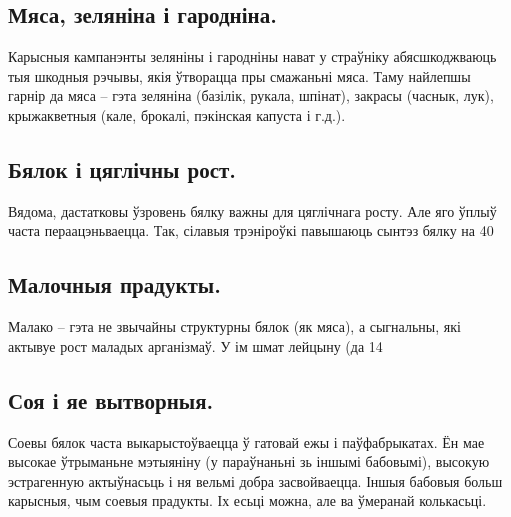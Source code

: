 \subsection{Мяса, зеляніна і гародніна.}
Карысныя кампанэнты зеляніны і гародніны нават у страўніку абясшкоджваюць тыя шкодныя рэчывы, якія ўтворацца пры смажаньні мяса. Таму найлепшы гарнір да мяса – гэта зеляніна (базілік, рукала, шпінат), закрасы (часнык, лук), крыжакветныя (кале, брокалі, пэкінская капуста і г.д.).

\subsection{Бялок і цяглічны рост.}
Вядома, дастатковы ўзровень бялку важны для цяглічнага росту. Але яго ўплыў часта пераацэньваецца. Так, сілавыя трэніроўкі павышаюць сынтэз бялку на 40%

\subsection{Малочныя прадукты.}
Малако – гэта не звычайны структурны бялок (як мяса), а сыгнальны, які актывуе рост маладых арганізмаў. У ім шмат лейцыну (да 14%

\subsection{Соя і яе вытворныя.}
Соевы бялок часта выкарыстоўваецца ў гатовай ежы і паўфабрыкатах. Ён мае высокае ўтрыманьне мэтыяніну (у параўнаньні зь іншымі бабовымі), высокую эстрагенную актыўнасьць і ня вельмі добра засвойваецца. Іншыя бабовыя больш карысныя, чым соевыя прадукты. Іх есьці можна, але ва ўмеранай колькасьці.


